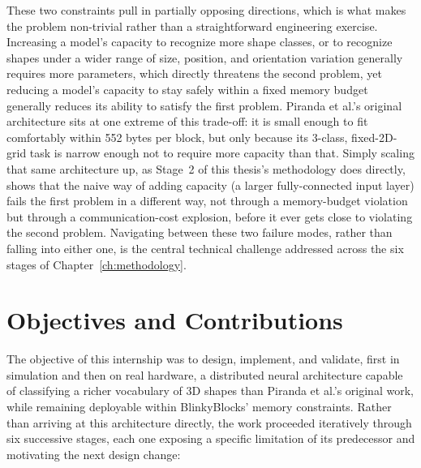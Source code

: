 \documentclass[12pt,a4paper]{report}
\begin{document}
These two constraints pull in partially opposing directions, which is what makes the problem non-trivial rather than a straightforward engineering exercise. Increasing a model's capacity to recognize more shape classes, or to recognize shapes under a wider range of size, position, and orientation variation generally requires more parameters, which directly threatens the second problem, yet reducing a model's capacity to stay safely within a fixed memory budget generally reduces its ability to satisfy the first problem. Piranda et al.'s original architecture sits at one extreme of this trade-off: it is small enough to fit comfortably within 552 bytes per block, but only because its 3-class, fixed-2D-grid task is narrow enough not to require more capacity than that. Simply scaling that same architecture up, as Stage~2 of this thesis's methodology does directly, shows that the naive way of adding capacity (a larger fully-connected input layer) fails the first problem in a different way, not through a memory-budget violation but through a communication-cost explosion, before it ever gets close to violating the second problem. Navigating between these two failure modes, rather than falling into either one, is the central technical challenge addressed across the six stages of Chapter~\ref{ch:methodology}.

\section{Objectives and Contributions}

The objective of this internship was to design, implement, and validate, first in simulation and then on real hardware, a distributed neural architecture capable of classifying a richer vocabulary of 3D shapes than Piranda et al.'s original work, while remaining deployable within BlinkyBlocks' memory constraints. Rather than arriving at this architecture directly, the work proceeded iteratively through six successive stages, each one exposing a specific limitation of its predecessor and motivating the next design change:
\end{document}
